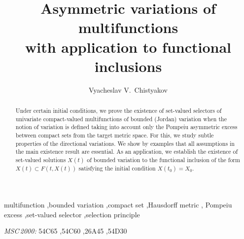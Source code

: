 \documentclass[preprint,12pt]{elsarticle}
\begin{document}
\begin{frontmatter}

\title{Asymmetric variations of multifunctions\\
       with application to functional inclusions}

\author[hsenn]{Vyacheslav V.~Chistyakov}




\address[hsenn]{Department of Informatics, Mathematics and Computer Science,\\
National Research University Higher School of Economics,\\
Bol'shaya Pech{\"e}rskaya Street 25/12, Nizhny Novgorod\\
603155, Russia}

\begin{abstract}
Under certain initial conditions, we prove the existence of set-valued selectors of
univariate compact-valued multifunctions of bounded (Jordan) variation when the notion
of variation is defined taking into account only the Pompeiu asymmetric excess between
compact sets from the target metric space. For this, we study subtle properties of
the directional variations. We show by examples that all assumptions in the main
existence result are essential. As an application, we establish the existence of
set-valued solutions $X(t)$ of bounded variation to the functional inclusion of the
form $X(t)\subset F(t,X(t))$ satisfying the initial condition $X(t_0)=X_0$. %
\end{abstract}

\begin{keyword}
multifunction \sep bounded variation \sep compact set \sep Hausdorff metric \sep
Pompeiu excess \sep set-valued selector \sep selection principle

{\em MSC\,2000:} 54C65 \sep 54C60 \sep 26A45 \sep 54D30
\end{keyword}
\end{frontmatter}
\end{document}
